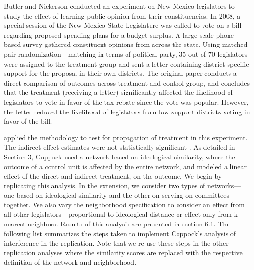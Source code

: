 \documentclass[12pt]{article}
\begin{document}
Butler and Nickerson conducted an experiment on New Mexico legislators to study the effect of learning public opinion from their constituencies. In 2008, a special session of the New Mexico State Legislature was called to vote on a bill regarding proposed spending plans for a budget surplus. A large-scale phone based survey gathered constituent opinions from across the state. Using matched-pair randomization---matching in terms of political party, 35 out of 70 legislators were assigned to the treatment group and sent a letter containing district-specific support for the proposal in their own districts. The original paper conducts a direct comparison of outcomes across treatment and control group, and concludes that the treatment (receiving a letter) significantly affected the likelihood of legislators to vote in favor of the tax rebate since the vote was popular. However, the letter reduced the likelihood of legislators from low support districts voting in favor of the bill. 

\citet{coppock2014information} applied the \citet{bowers2012reasoning} methodology to test for propagation of treatment in this experiment. The indirect effect estimates were not statistically significant \citep{coppock2016information}. As detailed in Section 3, Coppock used a network based on ideological similarity, where the outcome of a control unit is affected by the entire network, and modeled a linear effect of the direct and indirect treatment, on the outcome. We begin by replicating this analysis. In the extension, we consider two types of networks--- one based on ideological similarity and the other on serving on committees together. We also vary the neighborhood specification to consider an effect from all other legislators---proportional to ideological distance or effect only from k-nearest neighbors. Results of this analysis are presented in section 6.1. The following list summarizes the steps taken to implement Coppock's analysis of interference in the \citet{butler2011can} replication. Note that we re-use these steps in the other replication analyses where the similarity scores are replaced with the respective definition of the network and neighborhood.
\end{document}
